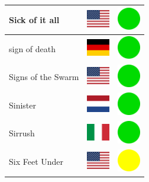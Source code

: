 \documentclass[12pt, a4paper, twoside]{report}
\begin{document}
\begin{center}
\begin{longtable}{|p{5cm}|p{2cm}|p{2cm}|}
 Sick of it all                                             & \includegraphics[width=1cm]{../img/flags/us} &   \includegraphics[width=1cm]{../likes/y} \\ \hline
 sign of death                                              & \includegraphics[width=1cm]{../img/flags/de} &   \includegraphics[width=1cm]{../likes/y} \\ \hline
 Signs of the Swarm                                         & \includegraphics[width=1cm]{../img/flags/us} &   \includegraphics[width=1cm]{../likes/y} \\ \hline
 Sinister                                                   & \includegraphics[width=1cm]{../img/flags/nl} &   \includegraphics[width=1cm]{../likes/y} \\ \hline
 Sirrush                                                    & \includegraphics[width=1cm]{../img/flags/it} &   \includegraphics[width=1cm]{../likes/y} \\ \hline
 Six Feet Under                                             & \includegraphics[width=1cm]{../img/flags/us} &   \includegraphics[width=1cm]{../likes/m} \\ \hline

\end{longtable}
\end{center}
\end{document}
